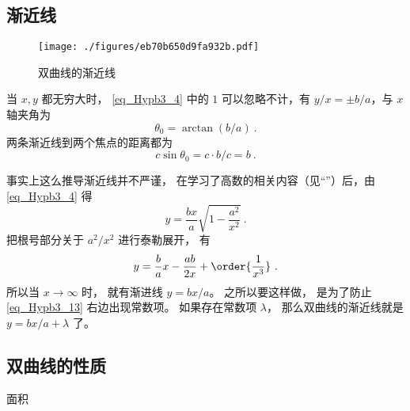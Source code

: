 \subsection{渐近线}
\begin{figure}[ht]
\centering
\texttt{[image: ./figures/eb70b650d9fa932b.pdf]}
\caption{双曲线的渐近线} \label{fig_Hypb3_1}
\end{figure}

当 $x,y$ 都无穷大时， \autoref{eq_Hypb3_4} 中的 $1$ 可以忽略不计，有 $y/x = \pm b/a$，与 $x$ 轴夹角为
\begin{equation}\label{eq_Hypb3_1}
\theta_0 = \arctan(b/a)~.
\end{equation}
两条渐近线到两个焦点的距离都为
\begin{equation}\label{eq_Hypb3_11}
c\sin\theta_0 = c\cdot b/c = b~.
\end{equation}


事实上这么推导渐近线并不严谨， 在学习了高数的相关内容（见“”）后，由\autoref{eq_Hypb3_4} 得
\begin{equation}
y = \frac{bx}{a} \sqrt{1-\frac{a^2}{x^2}}~.
\end{equation}
把根号部分关于 $a^2/x^2$ 进行泰勒展开， 有
\begin{equation}\label{eq_Hypb3_13}
y = \frac ba x - \frac{ab}{2x} + \order{\frac{1}{x^3}}~.
\end{equation}
所以当 $x\to\infty$ 时， 就有渐进线 $y = bx/a$。 之所以要这样做， 是为了防止\autoref{eq_Hypb3_13} 右边出现常数项。 如果存在常数项 $\lambda$， 那么双曲线的渐近线就是 $y = bx/a + \lambda$ 了。

\subsection{双曲线的性质}
面积









